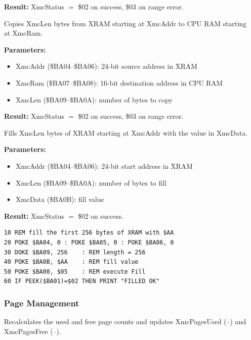 \textbf{Result:} XmcStatus $=$ \$02 on success, \$03 on range error.

\medskip


Copies XmcLen bytes from XRAM starting at XmcAddr to CPU RAM starting at
XmcRam.

\textbf{Parameters:}
\begin{itemize}
  \item XmcAddr (\$BA04--\$BA06): 24-bit source address in XRAM
  \item XmcRam (\$BA07--\$BA08): 16-bit destination address in CPU RAM
  \item XmcLen (\$BA09--\$BA0A): number of bytes to copy
\end{itemize}

\textbf{Result:} XmcStatus $=$ \$02 on success, \$03 on range error.

\medskip


Fills XmcLen bytes of XRAM starting at XmcAddr with the value in XmcData.

\textbf{Parameters:}
\begin{itemize}
  \item XmcAddr (\$BA04--\$BA06): 24-bit start address in XRAM
  \item XmcLen (\$BA09--\$BA0A): number of bytes to fill
  \item XmcData (\$BA0B): fill value
\end{itemize}

\textbf{Result:} XmcStatus $=$ \$02 on success.

\begin{lstlisting}
10 REM fill the first 256 bytes of XRAM with $AA
20 POKE $BA04, 0 : POKE $BA05, 0 : POKE $BA06, 0
30 DOKE $BA09, 256    : REM length = 256
40 POKE $BA0B, $AA    : REM fill value
50 POKE $BA00, $05    : REM execute Fill
60 IF PEEK($BA01)=$02 THEN PRINT "FILLED OK"
\end{lstlisting}

\subsubsection{Page Management}


Recalculates the used and free page counts and updates XmcPagesUsed
(--) and XmcPagesFree (--).


